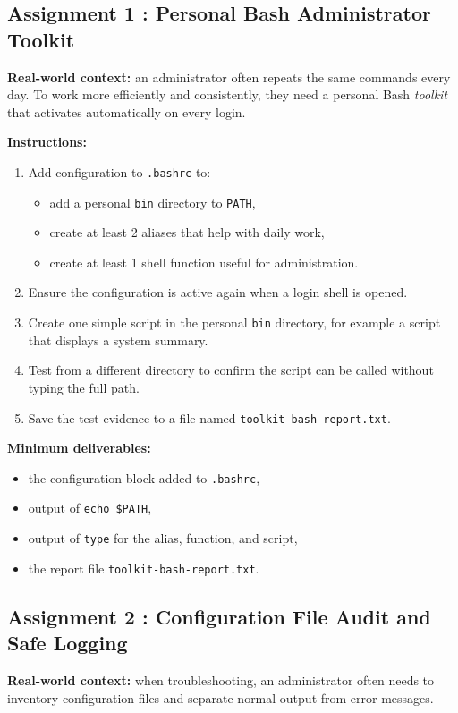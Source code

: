 \subsection*{Assignment 1 : Personal Bash Administrator Toolkit}
\textbf{Real-world context:} an administrator often repeats the same commands
every day. To work more efficiently and consistently, they need a personal
Bash \textit{toolkit} that activates automatically on every login.

\textbf{Instructions:}
\begin{enumerate}
  \item Add configuration to \texttt{.bashrc} to:
  \begin{itemize}
    \item add a personal \texttt{bin} directory to \texttt{PATH},
    \item create at least 2 aliases that help with daily work,
    \item create at least 1 shell function useful for administration.
  \end{itemize}
  \item Ensure the configuration is active again when a login shell is opened.
  \item Create one simple script in the personal \texttt{bin} directory, for
    example a script that displays a system summary.
  \item Test from a different directory to confirm the script can be called
    without typing the full path.
  \item Save the test evidence to a file named \texttt{toolkit-bash-report.txt}.
\end{enumerate}

\textbf{Minimum deliverables:}
\begin{itemize}
  \item the configuration block added to \texttt{.bashrc},
  \item output of \texttt{echo \$PATH},
  \item output of \texttt{type} for the alias, function, and script,
  \item the report file \texttt{toolkit-bash-report.txt}.
\end{itemize}

\subsection*{Assignment 2 : Configuration File Audit and Safe Logging}
\textbf{Real-world context:} when troubleshooting, an administrator often
needs to inventory configuration files and separate normal output from error
messages.

